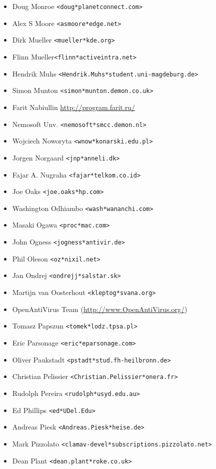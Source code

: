 \documentclass[a4paper,titlepage,12pt]{article}
\newcommand{\email}[1]{\texttt{#1}}
\begin{document}
\begin{itemize}
	\item Doug Monroe \email{<doug*planetconnect.com>}
	\item Alex S Moore \email{<asmoore*edge.net>}
	\item Dirk Mueller \email{<mueller*kde.org>}
	\item Flinn Mueller\email{<flinn*activeintra.net>}
	\item Hendrik Muhs \email{<Hendrik.Muhs*student.uni-magdeburg.de>}
	\item Simon Munton \email{<simon*munton.demon.co.uk>}
	\item Farit Nabiullin \url{http://program.farit.ru/}
	\item Nemosoft Unv. \email{<nemosoft*smcc.demon.nl>}
	\item Wojciech Noworyta \email{<wnow*konarski.edu.pl>}
	\item Jorgen Norgaard \email{<jnp*anneli.dk>}
	\item Fajar A. Nugraha \email{<fajar*telkom.co.id>}
	\item Joe Oaks \email{<joe.oaks*hp.com>}
	\item Washington Odhiambo \email{<wash*wananchi.com>}
	\item Masaki Ogawa \email{<proc*mac.com>}
	\item John Ogness \email{<jogness*antivir.de>}
	\item Phil Oleson \email{<oz*nixil.net>}
	\item Jan Ondrej \email{<ondrejj*salstar.sk>}
	\item Martijn van Oosterhout \email{<kleptog*svana.org>}
	\item OpenAntiVirus Team (\url{http://www.OpenAntiVirus.org/})
	\item Tomasz Papszun \email{<tomek*lodz.tpsa.pl>}
	\item Eric Parsonage \email{<eric*eparsonage.com>}
	\item Oliver Paukstadt \email{<pstadt*stud.fh-heilbronn.de>}
	\item Christian Pelissier \email{<Christian.Pelissier*onera.fr>}
	\item Rudolph Pereira \email{<rudolph*usyd.edu.au>}
	\item Ed Phillips \email{<ed*UDel.Edu>}
	\item Andreas Piesk \email{<Andreas.Piesk*heise.de>}
	\item Mark Pizzolato \email{<clamav-devel*subscriptions.pizzolato.net>}
	\item Dean Plant \email{<dean.plant*roke.co.uk>}

\end{itemize}
\end{document}
